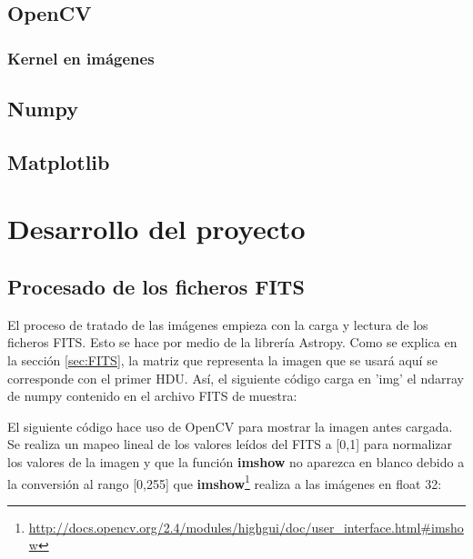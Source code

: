 \documentclass[a4paper,12pt]{article}
\begin{document}
\subsection{OpenCV}
\subsubsection{Kernel en imágenes}
\label{sec:Kernel}
\subsection{Numpy}
\subsection{Matplotlib}
\section{Desarrollo del proyecto}
\subsection{Procesado de los ficheros FITS}

El proceso de tratado de las imágenes empieza con la carga y lectura de los ficheros FITS. Esto se hace por medio de la librería Astropy. Como se explica en la sección \ref{sec:FITS}, la matriz que representa la imagen que se usará aquí se corresponde con el primer HDU. Así, el siguiente código carga en 'img' el ndarray de numpy contenido en el archivo FITS de muestra:



El siguiente código hace uso de OpenCV para mostrar la imagen antes cargada. Se realiza un mapeo lineal de los valores leídos del FITS a [0,1] para normalizar los valores de la imagen y que la función \textbf{imshow} no aparezca en blanco debido a la conversión al rango [0,255] que \textbf{imshow}\footnote{\url{http://docs.opencv.org/2.4/modules/highgui/doc/user_interface.html#imshow}} realiza a las imágenes en float 32:


\end{document}
